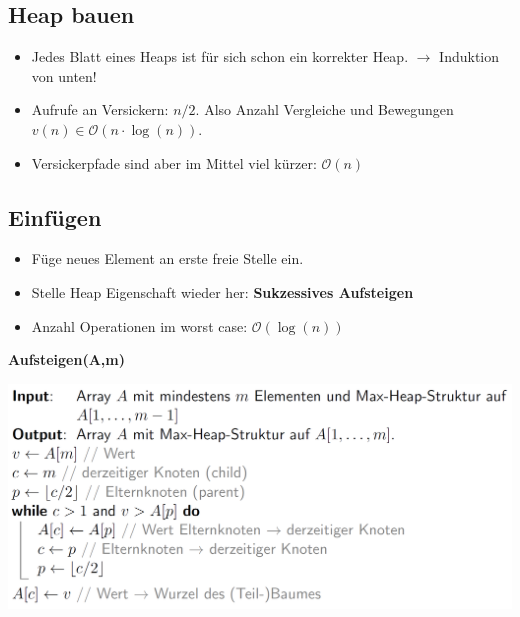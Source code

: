 \vspace{-4pt}
\begin{sectionbox}
\subsection{Heap bauen}\smallskip
\begin{itemize}
    \item Jedes Blatt eines Heaps ist für sich schon ein korrekter Heap. $\rightarrow$ Induktion von unten!
    \item Aufrufe an Versickern: $n/2$. Also Anzahl Vergleiche und Bewegungen $v(n) \in \mathcal{O}(n \cdot \operatorname{log}(n))$.
    \item Versickerpfade sind aber im Mittel viel kürzer: $\mathcal{O}(n)$
\end{itemize}
\end{sectionbox}
\vspace{-4pt}
\begin{sectionbox}
\subsection{Einfügen}\smallskip
\begin{itemize}
    \item Füge neues Element an erste freie Stelle ein.
    \item Stelle Heap Eigenschaft wieder her: \textbf{Sukzessives Aufsteigen}
    \item Anzahl Operationen im worst case: $\mathcal{O}(\operatorname{log}(n))$
\end{itemize}\smallskip
\textbf{Aufsteigen(A,m)}\par
\includegraphics[width = \columnwidth]{../img/Aufsteigen.png}
\end{sectionbox}
\vspace{-4pt}

